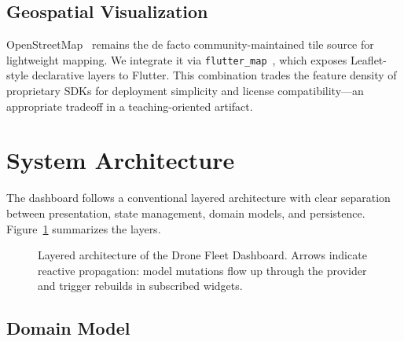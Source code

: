 \documentclass[conference]{IEEEtran}
\begin{document}
\subsection{Geospatial Visualization}

OpenStreetMap~\cite{haklay2008osm} remains the de facto community-maintained tile source for lightweight mapping. We integrate it via \texttt{flutter\_map}~\cite{fluttermap_pkg}, which exposes Leaflet-style declarative layers to Flutter. This combination trades the feature density of proprietary SDKs for deployment simplicity and license compatibility---an appropriate tradeoff in a teaching-oriented artifact.

\section{System Architecture}
\label{sec:architecture}

The dashboard follows a conventional layered architecture with clear separation between presentation, state management, domain models, and persistence. Figure~\ref{fig:architecture-text} summarizes the layers.

\begin{figure}[!t]
\centering
{}
\caption{Layered architecture of the Drone Fleet Dashboard. Arrows indicate reactive propagation: model mutations flow up through the provider and trigger rebuilds in subscribed widgets.}
\label{fig:architecture-text}
\end{figure}

\subsection{Domain Model}
\end{document}
